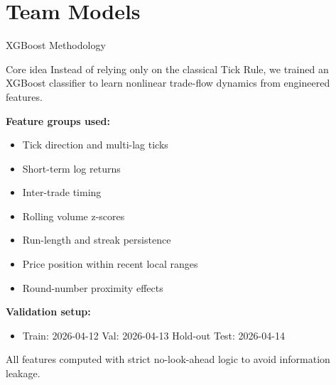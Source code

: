 \documentclass[aspectratio=169,10pt]{beamer}
\begin{document}
\section{Team Models}

\begin{frame}{XGBoost Methodology}

\small

\begin{block}{Core idea}
Instead of relying only on the classical Tick Rule, we trained an XGBoost classifier to learn nonlinear trade-flow dynamics from engineered features.
\end{block}

\smallskip
\textbf{Feature groups used:}
\begin{itemize}\setlength\itemsep{1pt}
    \item Tick direction and multi-lag ticks
    \item Short-term log returns
    \item Inter-trade timing
    \item Rolling volume z-scores
    \item Run-length and streak persistence
    \item Price position within recent local ranges
    \item Round-number proximity effects
\end{itemize}

\smallskip
\textbf{Validation setup:}
\begin{itemize}\setlength\itemsep{1pt}
    \item Train: 2026-04-12 \quad Val: 2026-04-13 \quad Hold-out Test: 2026-04-14
\end{itemize}

\smallskip
All features computed with strict no-look-ahead logic to avoid information leakage.

\end{frame}
\end{document}
